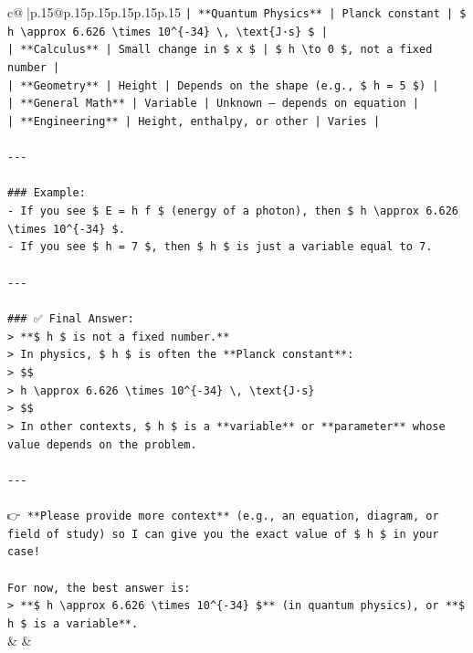 \documentclass{article}
\begin{document}
{\begin{supertabular}{c@{$\;$}|p{.15\linewidth}@{}p{.15\linewidth}p{.15\linewidth}p{.15\linewidth}p{.15\linewidth}p{.15\linewidth}}
{{{\texttt{| **Quantum Physics** | Planck constant | \$ h \textbackslash{}approx 6.626 \textbackslash{}times 10\^{}\{{-}34\} \textbackslash{}, \textbackslash{}text\{J·s\} \$ |} \\
\texttt{| **Calculus** | Small change in \$ x \$ | \$ h \textbackslash{}to 0 \$, not a fixed number |} \\
\texttt{| **Geometry** | Height | Depends on the shape (e.g., \$ h = 5 \$) |} \\
\texttt{| **General Math** | Variable | Unknown — depends on equation |} \\
\texttt{| **Engineering** | Height, enthalpy, or other | Varies |} \\
\\ 
\texttt{{-}{-}{-}} \\
\\ 
\texttt{\#\#\# Example:} \\
\texttt{{-} If you see \$ E = h f \$ (energy of a photon), then \$ h \textbackslash{}approx 6.626 \textbackslash{}times 10\^{}\{{-}34\} \$.} \\
\texttt{{-} If you see \$ h = 7 \$, then \$ h \$ is just a variable equal to 7.} \\
\\ 
\texttt{{-}{-}{-}} \\
\\ 
\texttt{\#\#\# ✅ Final Answer:} \\
\texttt{> **\$ h \$ is not a fixed number.**  } \\
\texttt{> In physics, \$ h \$ is often the **Planck constant**:  } \\
\texttt{> \$\$} \\
\texttt{> h \textbackslash{}approx 6.626 \textbackslash{}times 10\^{}\{{-}34\} \textbackslash{}, \textbackslash{}text\{J·s\}} \\
\texttt{> \$\$} \\
\texttt{> In other contexts, \$ h \$ is a **variable** or **parameter** whose value depends on the problem.} \\
\\ 
\texttt{{-}{-}{-}} \\
\\ 
\texttt{👉 **Please provide more context** (e.g., an equation, diagram, or field of study) so I can give you the exact value of \$ h \$ in your case!} \\
\\ 
\texttt{For now, the best answer is:} \\
\texttt{> **\$ h \textbackslash{}approx 6.626 \textbackslash{}times 10\^{}\{{-}34\} \$** (in quantum physics), or **\$ h \$ is a variable**.} \\
            }
        }
    }
    & & \\ \\


\end{supertabular}}
\end{document}
